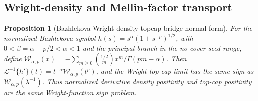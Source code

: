 \documentclass[11pt]{article}
\numberwithin{equation}{section}
\newtheorem{proposition}[theorem]{Proposition}
\theoremstyle{definition}
\theoremstyle{remark}
\newcommand{\1}{\mathbf 1}
\begin{document}
\subsection{Wright-density and Mellin-factor transport}
\begin{proposition}[Bazhlekova Wright density topcap bridge normal form]
\label{res:bazhlekova-wright-density-topcap-bridge-normal-form}
For the normalized Bazhlekova symbol \(h(s)=s^\alpha(1+s^{-p})^{1/2}\), with \(0<\beta=\alpha-p/2<\alpha<1\) and the principal branch in the no-cover seed range, define \(\mathcal W_{\alpha,p}(x)=-\sum_{m\ge0}\binom{1/2}{m}x^m/\Gamma(pm-\alpha)\). Then \(\mathcal L^{-1}\{h'\}(t)=t^{-\alpha}\mathcal W_{\alpha,p}(t^p)\), and the Wright top-cap limit has the same sign as \(\mathcal W_{\alpha,p}(\lambda^{-1})\). Thus normalized derivative density positivity and top-cap positivity are the same Wright-function sign problem.
\end{proposition}
\end{document}
